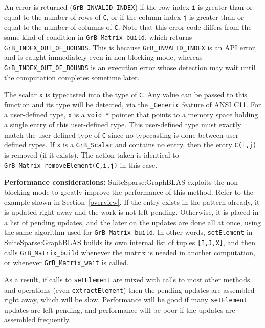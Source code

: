 \documentclass[12pt]{article}
\begin{document}
An error is returned (\verb'GrB_INVALID_INDEX') if the row index \verb'i' is
greater than or equal to the number of rows of \verb'C', or if the column index
\verb'j' is greater than or equal to the number of columns of \verb'C'.  Note
that this error code differs from the same kind of condition in
\verb'GrB_Matrix_build', which returns \verb'GrB_INDEX_OUT_OF_BOUNDS'.  This is
because \verb'GrB_INVALID_INDEX' is an API error, and is caught immediately
even in non-blocking mode, whereas \verb'GrB_INDEX_OUT_OF_BOUNDS' is an
execution error whose detection may wait until the computation completes
sometime later.

The scalar \verb'x' is typecasted into the type of \verb'C'.  Any value can be
passed to this function and its type will be detected, via the \verb'_Generic'
feature of ANSI C11.  For a user-defined type, \verb'x' is a \verb'void *'
pointer that points to a memory space holding a single entry of this
user-defined type.  This user-defined type must exactly match the user-defined
type of \verb'C' since no typecasting is done between user-defined types.
%
If \verb'x' is a \verb'GrB_Scalar' and contains no entry, then the
entry \verb'C(i,j)' is removed (if it exists).  The action taken is
identical to \verb'GrB_Matrix_removeElement(C,i,j)' in this case.

{\bf Performance considerations:} %
SuiteSparse:GraphBLAS exploits the non-blocking mode to greatly improve the
performance of this method.  Refer to the example shown in
Section~\ref{overview}.  If the entry exists in the pattern already, it is
updated right away and the work is not left pending.  Otherwise, it is placed
in a list of pending updates, and the later on the updates are done all at
once, using the same algorithm used for \verb'GrB_Matrix_build'.  In other
words, \verb'setElement' in SuiteSparse:GraphBLAS builds its own internal list
of tuples \verb'[I,J,X]', and then calls \verb'GrB_Matrix_build' whenever the
matrix is needed in another computation, or whenever \verb'GrB_Matrix_wait' is
called.

As a result, if calls to \verb'setElement' are mixed with calls to most other
methods and operations (even \verb'extractElement') then the pending updates
are assembled right away, which will be slow.  Performance will be good if many
\verb'setElement' updates are left pending, and performance will be poor if the
updates are assembled frequently.
\end{document}
